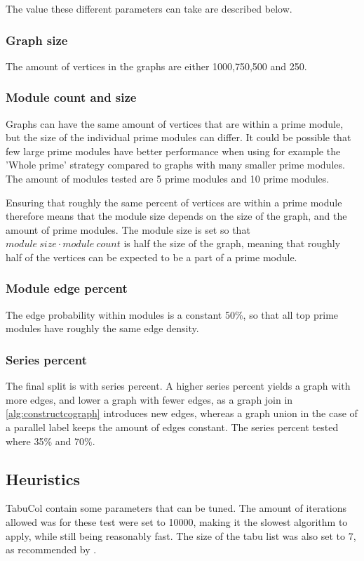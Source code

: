 \documentclass[a4paper]{article}
\begin{document}
The value these different parameters can take are described below.
\subsubsection{Graph size}

The amount of vertices in the graphs are either 1000,750,500 and 250.

\subsubsection{Module count and size}

Graphs can have the same amount of vertices that are within a prime module,
but the size of the individual prime modules can differ. It could be possible that
few large prime modules have better performance when using for example the
'Whole prime' strategy compared to graphs with many smaller prime modules.
The amount of modules tested are 5 prime modules and 10 prime modules.

Ensuring that roughly the same percent of vertices are within a prime module
therefore means that the module size depends on the size of the graph, and the
amount of prime modules. The module size is set so that $module\ size \cdot
module\ count$ is half the size of the graph, meaning that roughly half of the
vertices can be expected to be a part of a prime module.

\subsubsection{Module edge percent}
The edge probability within modules is a  constant 50\%, so that all top
prime modules have roughly the same edge density. 

\subsubsection{Series percent}
The final split is with series percent. A higher series percent yields a graph
with more edges, and lower a graph with fewer  edges, as a graph join in
\autoref{alg:constructcograph} introduces new edges, whereas a graph union in the
case of a parallel label keeps the amount of edges constant. The series percent
tested where 35\% and 70\%.

\subsection{Heuristics}
TabuCol contain some parameters that can be tuned. The amount of
iterations allowed was for these test were set to 10000, making it the slowest
algorithm to apply, while still being reasonably fast. The size of the tabu list 
was also set to 7, as recommended by \cite{1990}.
\end{document}
